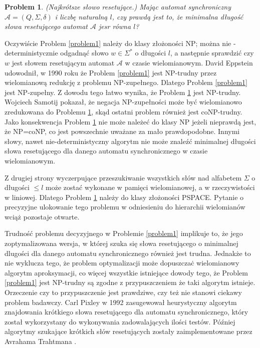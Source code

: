 \documentclass[12pt,a4paper]{article}
\newtheorem{pro}{Problem}[section]
\begin{document}
\begin{pro} 
\label{problem2}
(Najkr\'otsze s{\l}owo resetuj\k{a}ce.) Maj\k{a}c automat synchroniczny  $\mathscr{A}=(Q, \Sigma, \delta)$ i liczb\k{e} naturaln\k{a} $l$, czy prawd\k{a} jest to, \.ze minimalna  d{\l}ugo\'s\'c s{\l}owa resetuj\k{a}cego automat $\mathscr{A}$ jesr r\'owna $l$?
\end{pro}

Oczywi\'scie Problem \ref{problem1} nale\.zy do klasy z{\l}o\.zono\'sci NP; mo\.zna nie -deterministycznie odgadn\k{a}\'c s{\l}owo $w\in\Sigma^{*}$ o d{\l}ugo\'sci $l$, a nast\k{e}pnie sprawdzi\'c czy $w$ jest s{\l}owem resetuj\k{a}cym automat $\mathscr{A}$ w czasie wielomianowym. David Eppstein udowodni{\l}, w 1990 roku \.ze Problem \ref{problem1} jest NP-trudny przez wielomianow\k{a} redukcj\k{e} z problemu NP-zupe{\l}nego. Dlatego Problem \ref{problem1} jest NP-zupe{\l}ny. Z dowodu tego {\l}atwo wynika, \.ze Problem \ref{problem2} jest NP-trudny. Wojciech Samotij \cite{1} pokaza{\l}, \.ze negacja NP-zupe{\l}no\'sci mo\.ze by\'c wielomianowo zredukowana do Problemu \ref{problem2}, sk\k{a}d ostatni problem r\'ownie\.z jest coNP-trudny. Jako konsekwencja Problem \ref{problem2} nie mo\.ze nale\.ze\'c do klasy NP je\.zeli nieprawd\k{a} jest, \.ze NP=coNP, co jest powszechnie uwa\.zane za ma{\l}o prawdopodobne. Innymi s{\l}owy, nawet nie-deterministyczny algorytm nie mo\.ze znale\'z\'c minimalnej d{\l}ugo\'sci s{\l}owa resetuj\k{a}cego dla danego automatu synchronicznego w czasie wielomianowym.

Z drugiej strony wyczerpuj\k{a}ce przeszukiwanie wszystkich s{\l}\'ow nad alfabetem $\Sigma$ o d{\l}ugo\'sci $\leq l$ mo\.ze zosta\'c wykonane w pami\k{e}ci wielomianowej, a w rzeczywisto\'sci w liniowej. Dlatego Problem \ref{problem2} nale\.zy do klasy z{\l}o\.zono\'sci PSPACE. Pytanie o precyzyjne ulokowanie tego problemu w odniesieniu do hierarchii wielomian\'ow wci\k{a}\.z pozostaje otwarte. 

Trudno\'s\'c problemu decyzyjnego w Problemie \ref{problem1} implikuje to, \.ze jego zoptymalizowana wersja, w kt\'orej szuka si\k{e} s{\l}owa resetuj\k{a}cego o minimalnej d{l}ugo\'sci dla danego automatu synchronicznego r\'ownie\.z jest trudna. Jednak\.ze to nie wyklucza tego, \.ze problem optymalizacji mo\.ze dopuszcza\.c wielomianowy algorytm aproksymacji, co wi\k{e}cej wszystkie istniej\k{a}ce dowody tego, \.ze Problem \ref{problem1} jest NP-trudny s\k{a} zgodne z  przypuszczeniem \.ze taki algorytm istnieje. Orzeczenie czy to przypuszczenie jest prawdziwe, czy te\.z nie stanowi ciekawy problem badawczy. Carl Pixley \cite{2} w 1992 zasugewowa{\l} heurystyczny algorytm znajdowania kr\'otkiego s{\l}owa resetuj\k{a}cego dla automatu synchronicznego, kt\'ory zosta{\l} wykorzystany do wykonywania zadowalaj\k{a}cych ilo\'sci test\'ow. P\'o\'zniej algorytmy szukaj\k{a}ce kr\'otkich s{\l}\'ow resetuj\k{a}cych zosta{\l}y zaimplementowane przez Avrahama Trahtmana \cite{6}.
\end{document}
